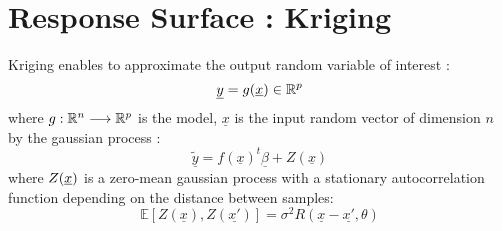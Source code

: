 
\newpage

\section{Response Surface : Kriging}
Kriging enables to approximate the output random variable of interest :
\begin{equation}\label{Model}
\underline{y} = g(\underline{x}) \in {\mathbb R}^p
\end{equation}
where $g : {\mathbb R}^n \longrightarrow {\mathbb R}^p $ is the model, $\underline{x}$ is the input random vector of dimension $n$ by the gaussian process :
\begin{equation}\label{metaModel}
\tilde{\underline{y}} = f(\underline{x}) ^t \underline{\beta} + Z(\underline{x})
\end{equation}
where $Z({\underline{x}})$ is a zero-mean gaussian process with a stationary autocorrelation function depending on the distance between samples:
\begin{equation}
\mathbb{E}[Z(\underline{x}), Z(\underline{x'})] = \sigma^2 R(\underline{x} - \underline{x'}, \theta)
\end{equation}

